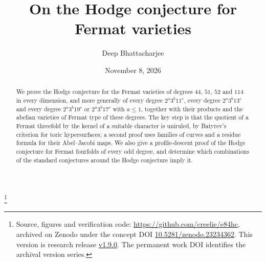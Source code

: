 \documentclass[11pt]{amsart}
\theoremstyle{definition}
\theoremstyle{remark}
\begin{document}
\title[On the Hodge conjecture for Fermat varieties]{On the Hodge conjecture
for Fermat varieties}

\author{Deep Bhattacharjee}
\address{Formerly, Electro-Gravitational Space Propulsion Laboratory (EGSPL),
Bhubaneswar, Odisha 751030, India}
\thanks{Source, figures and verification code:
\url{https://github.com/creelie/e84hc}, archived on Zenodo under the concept
DOI \href{https://doi.org/10.5281/zenodo.23234362}{10.5281/zenodo.23234362}.
This version is research release
\href{https://github.com/creelie/e84hc/releases/tag/v1.9.0}{v1.9.0}.
The permanent work DOI identifies the archival version series.}

\date{November 8, 2026}

\begin{abstract}
We prove the Hodge conjecture for the Fermat varieties of degrees $44$, $51$,
$52$ and $114$ in every dimension, and more generally of every degree
$2^{a}3^{b}11^{c}$, every degree $2^{a}3^{b}13^{c}$ and every degree
$2^{a}3^{b}19^{c}$ or $2^{a}3^{b}17^{c}$ with $a\le1$, together with their
products and the abelian varieties of Fermat type of these degrees. The key
step is that the quotient of a Fermat threefold by the kernel of a suitable
character is uniruled, by Batyrev's criterion for toric hypersurfaces; a
second proof uses families of curves and a residue formula for their
Abel--Jacobi maps. We also give a profile-descent proof of the Hodge
conjecture for Fermat fourfolds of every odd degree, and determine which
combinations of the standard conjectures around the Hodge conjecture imply
it.
\end{abstract}

\maketitle











\appendix






\end{document}
